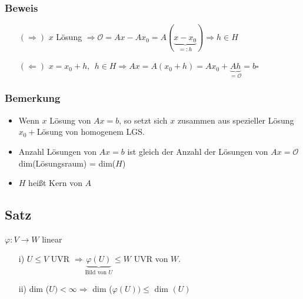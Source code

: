 \documentclass[12pt,titlepage, pdf]{article}
\newcommand{\qed}{\hfill$\square$}
\renewcommand{\>}{\rightarrow}
\renewcommand{\*}{\cdot}
\renewcommand{\O}{\mathcal{O}}
\renewcommand{\phi}{\varphi}
\begin{document}
		      			\subsubsection*{Beweis}
		      			\begin{itemize}
		      				\item[$(\Rightarrow)$] $x$ Lösung $\Rightarrow\O = Ax -Ax_0 = A(\underbrace{x-x_0}_{=:h}) \Rightarrow h \in H$
		      				\item[$(\Leftarrow)$] $x= x_0 + h,~~h \in H \Rightarrow Ax = A(x_0 + h) = Ax_0 + \underbrace{Ah}_{=\O} = b$\qed
		      			\end{itemize}
		      			\subsubsection*{Bemerkung}
		      			\begin{itemize}
		      				\item Wenn $x$ Lösung von $Ax = b$, so setzt sich $x$ zusammen aus spezieller Lösung $x_0 + $Lösung von homogenem LGS.
		      				\item Anzahl Lösungen von $Ax = b$ ist gleich der Anzahl der Lösungen von $Ax = \O$\\
		      				      dim(Lösungsraum) = dim($H$)
		      				\item $H$ heißt Kern von $A$
		      			\end{itemize}
		      			\subsection{Satz}
		      			\label{6.7}
		      			$\phi: V \rightarrow W$ linear
		      			\begin{itemize}
		      				\item[i)] $U \leq V$ UVR $\Rightarrow \underbrace{\phi(U)}_{\text{Bild von }U} \leq W $ UVR von $W$.
		      				\item[ii)]
		      				      dim ($U) < \infty \Rightarrow$ dim ($\phi(U)) \leq$ dim $(U)$
		      			\end{itemize}
\end{document}
